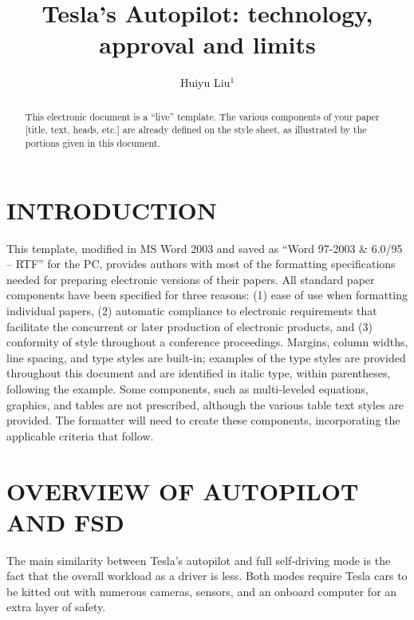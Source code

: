 \documentclass[letterpaper, 10 pt, conference]{ieeeconf}  %
\title{\LARGE \bf
Tesla's Autopilot: technology, approval and limits
}
\author{Huiyu Liu$^{1}$%
%
%
}
\begin{document}
\maketitle
\thispagestyle{empty}
\pagestyle{empty}


\begin{abstract}

This electronic document is a ``live'' template. The various components of your paper [title, text, heads, etc.] are already defined on the style sheet, as illustrated by the portions given in this document.

\end{abstract}


\section{INTRODUCTION}

This template, modified in MS Word 2003 and saved as ``Word 97-2003 \& 6.0/95 -- RTF'' for the PC, provides authors with most of the formatting specifications needed for preparing electronic versions of their papers. All standard paper components have been specified for three reasons: (1) ease of use when formatting individual papers, (2) automatic compliance to electronic requirements that facilitate the concurrent or later production of electronic products, and (3) conformity of style throughout a conference proceedings. Margins, column widths, line spacing, and type styles are built-in; examples of the type styles are provided throughout this document and are identified in italic type, within parentheses, following the example. Some components, such as multi-leveled equations, graphics, and tables are not prescribed, although the various table text styles are provided. The formatter will need to create these components, incorporating the applicable criteria that follow\cite{maitraapproach}.

\section{OVERVIEW OF AUTOPILOT AND FSD}

The main similarity between Tesla's autopilot and full self-driving mode is the fact that the overall workload as a driver is less. Both modes require Tesla cars to be kitted out with numerous cameras, sensors, and an onboard computer for an extra layer of safety.
\end{document}
